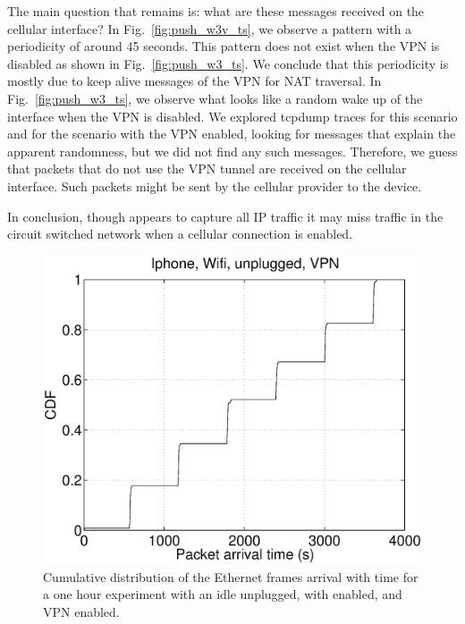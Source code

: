 The main question that remains is: what are these messages received on
the cellular interface? In Fig.~\ref{fig:push_w3v_ts}, we observe a pattern
with a periodicity of around 45 seconds. This pattern does not exist
when the VPN is disabled as shown in Fig.~\ref{fig:push_w3_ts}. We
conclude that this periodicity is mostly due to keep alive messages of the
VPN for NAT traversal. In Fig.~\ref{fig:push_w3_ts}, we observe what looks like
a random wake up of the \wifi interface when the VPN is disabled. We
explored tcpdump traces for this scenario and for the scenario with
the VPN enabled, looking for messages that explain the apparent
randomness, but we did not find any such messages. Therefore, we guess
that packets that do not use the VPN tunnel are received on the cellular 
interface. Such packets might be sent by the cellular provider to the
device. 

 

In conclusion, though \meddle appears to capture all IP traffic it may
miss traffic in the circuit switched network when a cellular connection is enabled.

\begin{figure}
\centering
        \includegraphics[width=0.8\linewidth]{../../code/pushNotification/Fig/bw_iphone_wifi_unplug_vpn_ts.eps}
  \caption{Cumulative distribution of the Ethernet frames
          arrival with time for a one hour experiment with an idle
          \iphone{} unplugged, with \wifi{} enabled, and VPN
          enabled.}
  \label{fig:push_wv_ts}
\end{figure}

